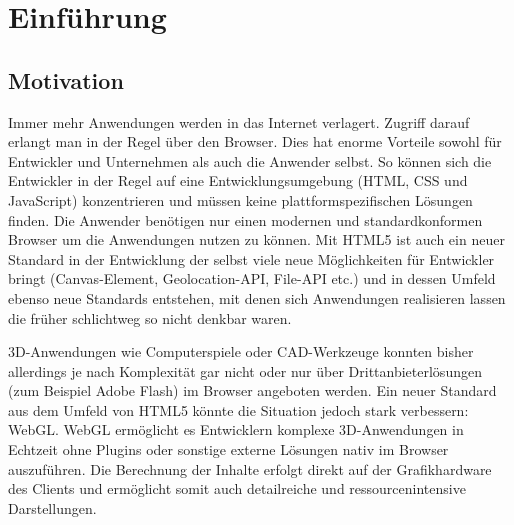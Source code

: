 \chapter{Einführung}
\label{chap:einführung}
\nocite{*}

\section{Motivation}
\label{sec:motivation}
Immer mehr Anwendungen werden in das Internet verlagert. Zugriff darauf erlangt man in der Regel über den Browser. Dies hat enorme Vorteile sowohl für Entwickler und Unternehmen als auch die Anwender selbst. So können sich die Entwickler in der Regel auf eine Entwicklungsumgebung (HTML, CSS und JavaScript) konzentrieren und müssen keine plattformspezifischen Lösungen finden. Die Anwender benötigen nur einen modernen und standardkonformen Browser um die Anwendungen nutzen zu können. Mit HTML5 ist auch ein neuer Standard in der Entwicklung der selbst viele neue Möglichkeiten für Entwickler bringt (Canvas-Element, Geolocation-API, File-API etc.) und in dessen Umfeld ebenso neue Standards entstehen, mit denen sich Anwendungen realisieren lassen die früher schlichtweg so nicht denkbar waren.

3D-Anwendungen wie Computerspiele oder CAD-Werkzeuge konnten bisher allerdings je nach Komplexität gar nicht oder nur über Drittanbieterlösungen (zum Beispiel Adobe Flash) im Browser angeboten werden. Ein neuer Standard aus dem Umfeld von HTML5 könnte die Situation jedoch stark verbessern: WebGL. WebGL ermöglicht es Entwicklern komplexe 3D-Anwendungen in Echtzeit ohne Plugins oder sonstige externe Lösungen nativ im Browser auszuführen. Die Berechnung der Inhalte erfolgt direkt auf der Grafikhardware des Clients und ermöglicht somit auch detailreiche und ressourcenintensive Darstellungen.

